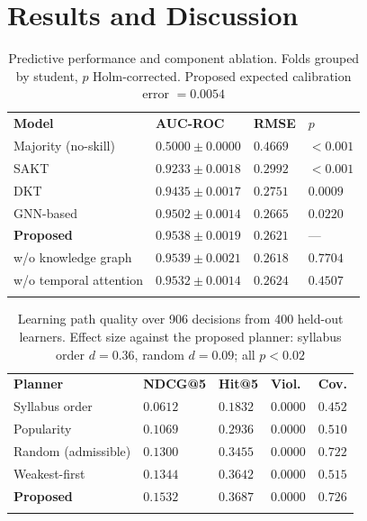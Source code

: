 \documentclass[graybox]{SNmult}
\begin{document}
\section{Results and Discussion}
\label{sec:results}

\begin{table}[t]
\caption{Predictive performance and component ablation. Folds grouped by student, $p$ Holm-corrected. Proposed expected calibration error $=0.0054$}
\label{tab:accuracy}
\begin{tabular}{p{4.4cm}p{3.1cm}p{1.8cm}p{1.6cm}}
\hline\noalign{\smallskip}
\textbf{Model} & \textbf{AUC-ROC} & \textbf{RMSE} & \textbf{$p$} \\
\noalign{\smallskip}\svhline\noalign{\smallskip}
Majority (no-skill) & $0.5000 \pm 0.0000$ & $0.4669$ & $<0.001$ \\
SAKT                & $0.9233 \pm 0.0018$ & $0.2992$ & $<0.001$ \\
DKT                 & $0.9435 \pm 0.0017$ & $0.2751$ & $0.0009$ \\
GNN-based           & $0.9502 \pm 0.0014$ & $0.2665$ & $0.0220$ \\
\textbf{Proposed}   & $\mathbf{0.9538 \pm 0.0019}$ & $\mathbf{0.2621}$ & --- \\
\noalign{\smallskip}\hline\noalign{\smallskip}
\quad w/o knowledge graph    & $0.9539 \pm 0.0021$ & $0.2618$ & $0.7704$ \\
\quad w/o temporal attention & $0.9532 \pm 0.0014$ & $0.2624$ & $0.4507$ \\
\noalign{\smallskip}\hline\noalign{\smallskip}
\end{tabular}
\end{table}

\begin{table}[t]
\caption{Learning path quality over 906 decisions from 400 held-out learners. Effect size against the proposed planner: syllabus order $d=0.36$, random $d=0.09$; all $p<0.02$}
\label{tab:pathquality}
\begin{tabular}{p{3.6cm}p{2.0cm}p{1.8cm}p{1.8cm}p{1.8cm}}
\hline\noalign{\smallskip}
\textbf{Planner} & \textbf{NDCG@5} & \textbf{Hit@5} & \textbf{Viol.} & \textbf{Cov.} \\
\noalign{\smallskip}\svhline\noalign{\smallskip}
Syllabus order      & $0.0612$ & $0.1832$ & $0.0000$ & $0.452$ \\
Popularity          & $0.1069$ & $0.2936$ & $0.0000$ & $0.510$ \\
Random (admissible) & $0.1300$ & $0.3455$ & $0.0000$ & $0.722$ \\
Weakest-first       & $0.1344$ & $0.3642$ & $0.0000$ & $0.515$ \\
\textbf{Proposed}   & $\mathbf{0.1532}$ & $\mathbf{0.3687}$ & $\mathbf{0.0000}$ & $\mathbf{0.726}$ \\
\noalign{\smallskip}\hline\noalign{\smallskip}
\end{tabular}
\end{table}
\end{document}
